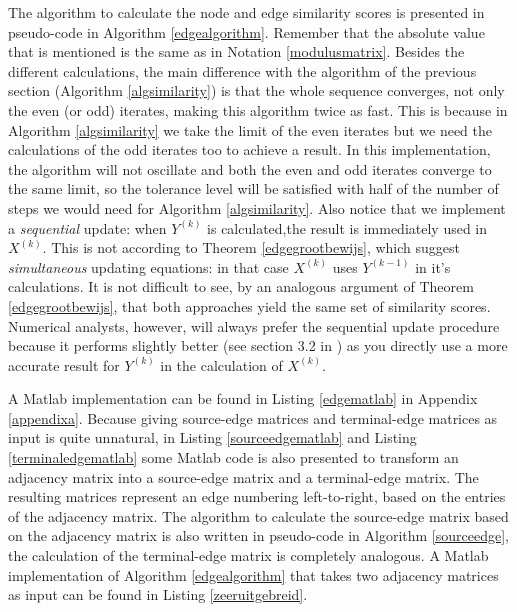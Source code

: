 \documentclass[a4paper,11pt]{report}
\begin{document}
 The algorithm to calculate the node and edge similarity scores is presented in pseudo-code in Algorithm \ref{edgealgorithm}. 
 Remember that the absolute value that is mentioned is the same as in Notation 
 \ref{modulusmatrix}. Besides the different calculations, the main difference with the algorithm of the previous section (Algorithm \ref{algsimilarity})
 is that the whole sequence converges, not only the even (or odd) iterates, 
 making this algorithm twice as fast. This is because in Algorithm \ref{algsimilarity} we take the limit
 of the even iterates but we need the calculations of the odd iterates too to achieve a result. In this
 implementation, the algorithm will not oscillate and both the even and odd iterates converge to the same limit, so the tolerance level will
 be satisfied with half of the number of steps we would need for Algorithm \ref{algsimilarity}. Also notice that we implement a \textit{sequential} 
 update: when $Y^{(k)}$ is calculated,the result is immediately used in 
 $X^{(k)}$. This is not according to Theorem \ref{edgegrootbewijs}, which 
 suggest \textit{simultaneous} updating equations: in that case $X^{(k)}$ uses $Y^{(k-1)}$ 
 in it's calculations. It is not difficult to see, by an analogous argument of 
 Theorem \ref{edgegrootbewijs}, that both approaches yield the same set of 
 similarity scores. Numerical analysts, however, will always prefer the sequential
 update procedure because it performs slightly better (see section 3.2 in \cite{numeriekwiskunde}) as you directly use a more accurate 
 result for $Y^{(k)}$ in the calculation of $X^{(k)}$. 
 
 A Matlab implementation 
 can be found in Listing \ref{edgematlab} in Appendix \ref{appendixa}. Because giving source-edge matrices and terminal-edge matrices as input
 is quite unnatural, in Listing \ref{sourceedgematlab} and Listing \ref{terminaledgematlab} 
 some Matlab code is also presented to transform an adjacency matrix into a 
 source-edge matrix and a terminal-edge matrix. The resulting matrices represent an edge numbering left-to-right, based on the entries of the adjacency matrix. The algorithm to calculate the 
 source-edge matrix based on the adjacency matrix is also written in pseudo-code in Algorithm 
 \ref{sourceedge}, the calculation of the terminal-edge matrix is completely 
 analogous. A Matlab implementation of Algorithm \ref{edgealgorithm} that takes 
 two adjacency matrices as input can be found in Listing \ref{zeeruitgebreid}.
 
\end{document}
